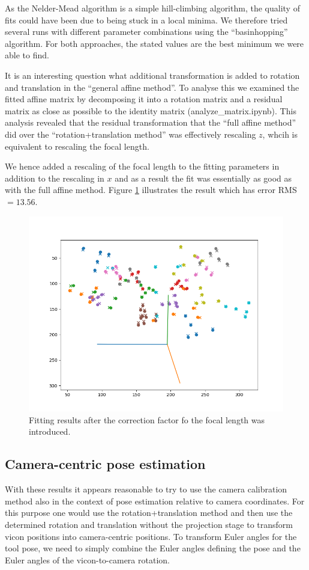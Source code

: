 \documentclass{article}
\begin{document}
As the Nelder-Mead algorithm is a simple hill-climbing algorithm, the quality of fits could have been due to being stuck in a local minima. We therefore tried several runs with different parameter combinations using the ``basinhopping'' algorithm. For both approaches, the stated values are the best minimum we were able to find.

It is an interesting question what additional transformation is added to rotation and translation in the ``general affine method''. To analyse this we examined the fitted affine matrix by decomposing it into a rotation matrix and a residual matrix as close as possible to the identity matrix (analyze\_matrix.ipynb). This analysis revealed that the residual transformation that the ``full affine method'' did over the ``rotation+translation method'' was effectively rescaling $z$, whcih is equivalent to rescaling the focal length.

We hence added a rescaling of the focal length to the fitting parameters in addition to the rescaling in $x$ and as a result the fit was essentially as good as with the full affine method.
Figure \ref{figure3} illustrates the result which has error RMS$= 13.56$.

\begin{figure}
  \includegraphics[width=\textwidth]{figure_match_euler.png}
  \caption{\label{figure3} Fitting results after the correction factor fo the focal length was introduced.}
\end{figure}

\subsection{Camera-centric pose estimation}
With these results it appears reasonable to try to use the camera calibration method also in the context of pose estimation relative to camera coordinates. For this purpose one would use the rotation+translation method and then use the determined rotation and translation without the projection stage to transform vicon positions into camera-centric positions. To transform Euler angles for the tool pose, we need to simply combine the Euler angles defining the pose and the Euler angles of the vicon-to-camera rotation.
\end{document}
